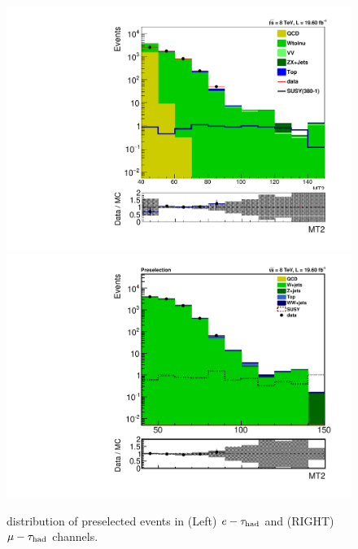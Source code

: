 \begin{figure}[htbp]
\centering
\includegraphics[angle=0,scale=0.35]{SelectionEleTau/MT2.pdf}
\includegraphics[angle=0,scale=0.35]{SelectionMuTau/MT2_muTau.pdf}
\caption{\mttwo distribution of preselected events in (Left) $e-\tau_{\rm had}$ and (RIGHT) $\mu-\tau_{\rm had}$ channels.}
\label{fig:mt2leptontau}
\end{figure}

